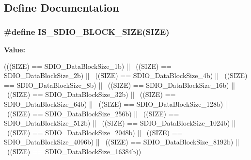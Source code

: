 \subsection{Define Documentation}
\hypertarget{group__SDIO__Data__Block__Size_ga25ce8d64134659c479d61aa681761948}{
\subsubsection[{IS\_\-SDIO\_\-BLOCK\_\-SIZE}]{\setlength{\rightskip}{0pt plus 5cm}\#define IS\_\-SDIO\_\-BLOCK\_\-SIZE(SIZE)}}
\label{group__SDIO__Data__Block__Size_ga25ce8d64134659c479d61aa681761948}
{\bfseries Value:}
\begin{DoxyCode}
(((SIZE) == SDIO_DataBlockSize_1b) || \
                                  ((SIZE) == SDIO_DataBlockSize_2b) || \
                                  ((SIZE) == SDIO_DataBlockSize_4b) || \
                                  ((SIZE) == SDIO_DataBlockSize_8b) || \
                                  ((SIZE) == SDIO_DataBlockSize_16b) || \
                                  ((SIZE) == SDIO_DataBlockSize_32b) || \
                                  ((SIZE) == SDIO_DataBlockSize_64b) || \
                                  ((SIZE) == SDIO_DataBlockSize_128b) || \
                                  ((SIZE) == SDIO_DataBlockSize_256b) || \
                                  ((SIZE) == SDIO_DataBlockSize_512b) || \
                                  ((SIZE) == SDIO_DataBlockSize_1024b) || \
                                  ((SIZE) == SDIO_DataBlockSize_2048b) || \
                                  ((SIZE) == SDIO_DataBlockSize_4096b) || \
                                  ((SIZE) == SDIO_DataBlockSize_8192b) || \
                                  ((SIZE) == SDIO_DataBlockSize_16384b))
\end{DoxyCode}
